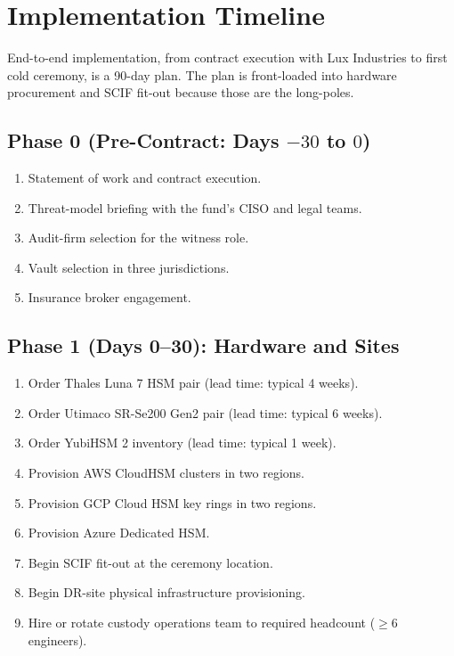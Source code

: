\section{Implementation Timeline}

\label{sec:timeline}

End-to-end implementation, from contract execution with Lux
Industries to first cold ceremony, is a 90-day plan. The plan is
front-loaded into hardware procurement and SCIF fit-out because
those are the long-poles.

\subsection{Phase 0 (Pre-Contract: Days $-30$ to $0$)}

\begin{enumerate}[nosep]
\item Statement of work and contract execution.
\item Threat-model briefing with the fund's CISO and legal teams.
\item Audit-firm selection for the witness role.
\item Vault selection in three jurisdictions.
\item Insurance broker engagement.
\end{enumerate}

\subsection{Phase 1 (Days 0--30): Hardware and Sites}

\begin{enumerate}[nosep]
\item Order Thales Luna 7 HSM pair (lead time: typical 4 weeks).
\item Order Utimaco SR-Se200 Gen2 pair (lead time: typical 6 weeks).
\item Order YubiHSM 2 inventory (lead time: typical 1 week).
\item Provision AWS CloudHSM clusters in two regions.
\item Provision GCP Cloud HSM key rings in two regions.
\item Provision Azure Dedicated HSM.
\item Begin SCIF fit-out at the ceremony location.
\item Begin DR-site physical infrastructure provisioning.
\item Hire or rotate custody operations team to required headcount
(\(\geq 6\) engineers).
\end{enumerate}


